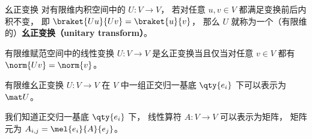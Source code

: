 
\begin{issues}
\issueDraft
\end{issues}


\begin{definition}{幺正变换}
对有限维内积空间中的 $U: V\to V$， 若对任意 $u, v \in V$ 都满足变换前后内积不变， 即 $\braket{Uu}{Uv} = \braket{u}{v}$， 那么 $U$ 就称为一个（有限维的）\textbf{幺正变换（unitary transform）}。
\end{definition}

\begin{theorem}{}
有限维赋范空间中的线性变换 $U: V\to V$ 是幺正变换当且仅当对任意 $v\in V$ 都有 $\norm{Uv} = \norm{v}$。
\end{theorem}

\begin{theorem}{}
有限维幺正变换 $U: V\to V$ 在 $V$ 中一组正交归一基底 $\qty{e_i}$ 下可以表示为 $\mat U$。
\end{theorem}
我们知道正交归一基底 $\qty{e_i}$ 下， 线性算符 $A:V\to V$ 可以表示为矩阵， 矩阵元为%
$A_{i,j} = \mel{e_i}{A}{e_j}$。

